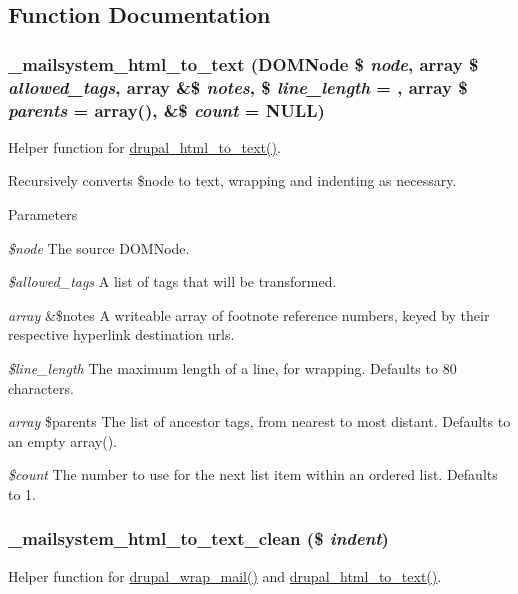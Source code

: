 \subsection{Function Documentation}
\hypertarget{html__to__text_8inc_af581a74a8de0f0cbedc673623bccdc5d}{
\subsubsection[{\_\-mailsystem\_\-html\_\-to\_\-text}]{\setlength{\rightskip}{0pt plus 5cm}\_\-mailsystem\_\-html\_\-to\_\-text (DOMNode \$ {\em node}, \/  array \$ {\em allowed\_\-tags}, \/  array \&\$ {\em notes}, \/  \$ {\em line\_\-length} = {}, \/  array \$ {\em parents} = {\ttfamily array()}, \/  \&\$ {\em count} = {\ttfamily NULL})}}
\label{html__to__text_8inc_af581a74a8de0f0cbedc673623bccdc5d}
Helper function for \hyperlink{mail_8inc_a1d324056cce089d2fc06dedee5b6e92e}{drupal\_\-html\_\-to\_\-text()}.

Recursively converts \$node to text, wrapping and indenting as necessary.


\begin{DoxyParams}{Parameters}
\item[{\em \$node}]The source DOMNode. \item[{\em \$allowed\_\-tags}]A list of tags that will be transformed. \item[{\em array}]\&\$notes A writeable array of footnote reference numbers, keyed by their respective hyperlink destination urls. \item[{\em \$line\_\-length}]The maximum length of a line, for wrapping. Defaults to 80 characters. \item[{\em array}]\$parents The list of ancestor tags, from nearest to most distant. Defaults to an empty array(). \item[{\em \$count}]The number to use for the next list item within an ordered list. Defaults to 1. \end{DoxyParams}
\hypertarget{html__to__text_8inc_a33422aa7297978d57f41144ae705ed60}{
\subsubsection[{\_\-mailsystem\_\-html\_\-to\_\-text\_\-clean}]{\setlength{\rightskip}{0pt plus 5cm}\_\-mailsystem\_\-html\_\-to\_\-text\_\-clean (\$ {\em indent})}}
\label{html__to__text_8inc_a33422aa7297978d57f41144ae705ed60}
Helper function for \hyperlink{mail_8inc_a955ffecc70c15ab89079ea29557f7b41}{drupal\_\-wrap\_\-mail()} and \hyperlink{mail_8inc_a1d324056cce089d2fc06dedee5b6e92e}{drupal\_\-html\_\-to\_\-text()}.

